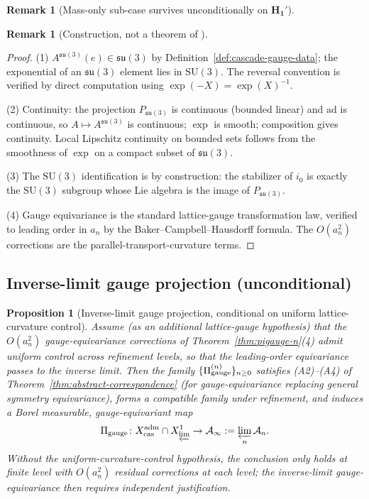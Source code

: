\documentclass[11pt, a4paper]{amsart}
\newtheorem{proposition}[theorem]{Proposition}
\theoremstyle{definition}
\newtheorem{remark}[theorem]{Remark}
\newcommand{\cas}{{\rm cas}}
\newcommand{\gge}{{\rm gauge}}
\begin{document}
\begin{remark}[Mass-only sub-case survives unconditionally on $\mathbf{H_1'}$]
\begin{remark}[Construction, not a theorem of \cite{CascadeEmbeddings}]
\begin{proof}
(1) $A^{\mathfrak{su}(3)}(e) \in \mathfrak{su}(3)$ by
Definition~\ref{def:cascade-gauge-data}; the exponential of an
$\mathfrak{su}(3)$ element lies in $\mathrm{SU}(3)$. The reversal
convention is verified by direct computation using
$\exp(-X) = \exp(X)^{-1}$.

(2) Continuity: the projection $P_{\mathfrak{su}(3)}$ is
continuous (bounded linear) and $\mathrm{ad}$ is continuous, so
$A \mapsto A^{\mathfrak{su}(3)}$ is continuous; $\exp$ is smooth;
composition gives continuity. Local Lipschitz continuity on bounded
sets follows from the smoothness of $\exp$ on a compact subset of
$\mathfrak{su}(3)$.

(3) The $\mathrm{SU}(3)$ identification is by construction: the
stabilizer of $i_0$ is exactly the $\mathrm{SU}(3)$ subgroup whose
Lie algebra is the image of $P_{\mathfrak{su}(3)}$.

(4) Gauge equivariance is the standard lattice-gauge transformation
law, verified to leading order in $a_n$ by the
Baker--Campbell--Hausdorff formula. The $O(a_n^2)$ corrections are
the parallel-transport-curvature terms.
\end{proof}

\subsection{Inverse-limit gauge projection (unconditional)}
\label{subsec:pigauge-inv}

\begin{proposition}[Inverse-limit gauge projection, conditional on uniform lattice-curvature control]
\label{prop:pigauge-inv-lim}
Assume (as an additional lattice-gauge hypothesis) that the
$O(a_n^2)$ gauge-equivariance corrections of
Theorem~\ref{thm:pigauge-n}(4) admit uniform control across
refinement levels, so that the leading-order equivariance passes
to the inverse limit. Then the family
$\{\Pi_{\gge}^{(n)}\}_{n \geq 0}$ satisfies (A2)--(A4)
of Theorem~\ref{thm:abstract-correspondence} (for gauge-equivariance
replacing general symmetry equivariance), forms a compatible family
under refinement, and induces a Borel measurable, gauge-equivariant
map
\[
  \Pi_{\gge} \colon X_\cas^{\rm adm} \cap X^1_{\varprojlim}
  \to \mathcal{A}_\infty
  := \varprojlim_n \mathcal{A}_n.
\]
Without the uniform-curvature-control hypothesis, the conclusion
only holds at finite level with $O(a_n^2)$ residual corrections
at each level; the inverse-limit gauge-equivariance then requires
independent justification.
\end{proposition}


\end{remark}
\end{remark}
\end{document}
